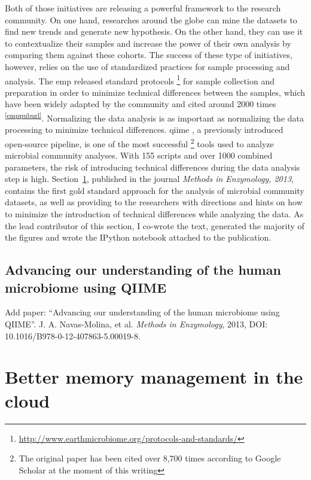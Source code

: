 \documentclass[12pt,chapterheads]{ucsd}
\begin{document}
Both of those initiatives are releasing a powerful framework to the research
community. On one hand, researches around the globe can mine the datasets to
find new trends and generate new hypothesis. On the other hand, they can use
it to contextualize their samples and increase the power of their own analysis
by comparing them against these cohorts. The success of these type of initiatives,
however, relies on the use of standardized practices for sample processing and
analysis. The \gls{emp} released standard protocols
\footnote{ \url{http://www.earthmicrobiome.org/protocols-and-standards/}} for
sample collection and preparation in order to minimize technical differences
between the samples, which have been widely adapted by the community and cited
around 2000 times \textsuperscript{\ref{emppuburl}}. Normalizing the data
analysis is as important as normalizing the data processing to minimize
technical differences. \gls{qiime} \cite{Caporaso2010}, a previously introduced
open-source pipeline, is one of the most successful \footnote{The original paper
has been cited over 8,700 times according to Google Scholar at the moment of this writing}
tools used to analyze microbial community analyses. With 155 scripts and over 1000 combined
parameters, the risk of introducing technical differences during the data analysis
step is high. Section~\ref{section_book}, published in the journal
\textsl{Methods in Enzymology, 2013}, contains the first gold standard approach
for the analysis of microbial community datasets, as well as providing to the
researchers with directions and hints on how to minimize the introduction of
technical differences while analyzing the data. As the lead contributor of this
section, I co-wrote the text, generated the majority of the figures and wrote
the IPython notebook \cite{Perez2007} attached to the publication.


% 
\section{Advancing our understanding of the human microbiome using QIIME}\label{section_book}
Add paper: ``Advancing our understanding of the human microbiome using QIIME''. J. A. Navas-Molina, et al. \emph{Methods in Enzymology}, 2013, DOI: 10.1016/B978-0-12-407863-5.00019-8.




\chapter{Better memory management in the cloud}\label{chapter_cudswap}
\glsresetall
% 
% 
\end{document}
